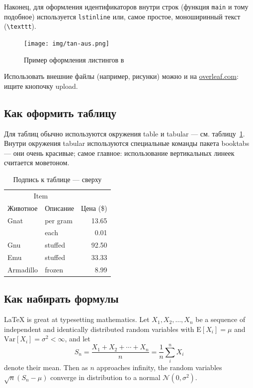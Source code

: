 Наконец, для оформления идентификаторов внутри строк
(функция \lstinline{main} и тому подобное) используется
\texttt{lstinline} или, самое простое, моноширинный текст
(\texttt{\textbackslash texttt}).

\begin{figure}[p]%
\centering
\texttt{[image: img/tan-aus.png]}
\caption{\label{fig:tan-aus}Пример оформления листингов в~\autocite{TanAus2013}}
\end{figure}

Использовать внешние файлы (например, рисунки) можно и на \href{http://overleaf.com}{overleaf.com}: ищите кнопочку upload.

\subsection{Как оформить таблицу}

Для таблиц обычно используются окружения table и tabular --- см. таблицу~\ref{tab:widgets}. Внутри окружения tabular используются специальные команды пакета booktabs — они очень красивые; самое главное: использование вертикальных линеек считается моветоном.

\begin{table}
\centering
\caption{\label{tab:widgets}Подпись к таблице --- сверху}
\begin{tabular}{llr}
\toprule
\multicolumn{2}{c}{Item} \\
\cmidrule(r){1-2}
Животное  & Описание    & Цена (\$) \\
\midrule
Gnat      & per gram    & 13.65      \\
          & each        & 0.01       \\
Gnu       & stuffed     & 92.50      \\
Emu       & stuffed     & 33.33      \\
Armadillo & frozen      & 8.99       \\
\bottomrule
\end{tabular}
\end{table}

\subsection{Как набирать формулы}

\LaTeX{} is great at typesetting mathematics. Let $X_1, X_2, \ldots, X_n$ be a sequence of independent and identically distributed random variables with $\text{E}[X_i] = \mu$ and $\text{Var}[X_i] = \sigma^2 < \infty$, and let
$$S_n = \frac{X_1 + X_2 + \cdots + X_n}{n}
      = \frac{1}{n}\sum_{i}^{n} X_i$$
denote their mean. Then as $n$ approaches infinity, the random variables $\sqrt{n}(S_n - \mu)$ converge in distribution to a normal $\mathcal{N}(0, \sigma^2)$.


